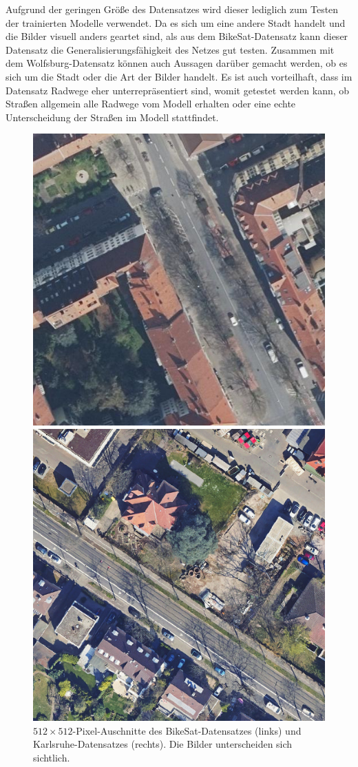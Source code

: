 Aufgrund der geringen Größe des Datensatzes wird dieser lediglich zum Testen der trainierten Modelle verwendet. 
Da es sich um eine andere Stadt handelt und die Bilder visuell anders geartet sind, als aus dem BikeSat-Datensatz 
kann dieser Datensatz die Generalisierungsfähigkeit des Netzes gut testen. Zusammen mit dem Wolfsburg-Datensatz 
können auch Aussagen darüber gemacht werden, ob es sich um die Stadt oder die Art der Bilder handelt. 
Es ist auch vorteilhaft, dass im Datensatz Radwege eher unterrepräsentiert sind, womit getestet werden kann, 
ob Straßen allgemein alle Radwege vom Modell erhalten oder eine echte Unterscheidung der Straßen im Modell stattfindet.

\begin{figure}[h]
	\centering
	\begin{minipage}{.45\textwidth}
		\centering
		\includegraphics[width=.7\linewidth]{Bilder/comp-bikesat.png} 
	\end{minipage}
	\begin{minipage}{.45\textwidth}
		\centering
		\includegraphics[width=.7\linewidth]{Bilder/comp-karlsruhe.png} 
	\end{minipage}

	\caption{$512{\times}512$-Pixel-Auschnitte des BikeSat-Datensatzes (links) 
	und Karlsruhe-Datensatzes (rechts). Die Bilder unterscheiden sich sichtlich.}
	\label{fig:comp-bikesat-karlsruhe}
\end{figure} 


